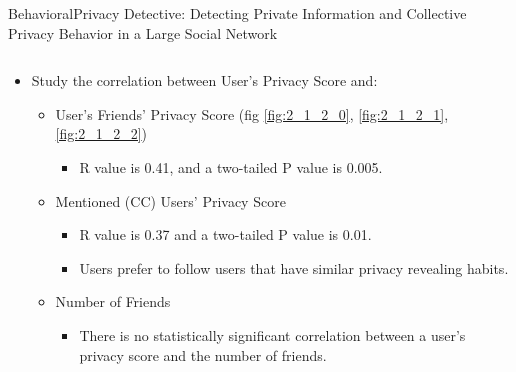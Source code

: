 \begin{frame}{Behavioral}{Privacy Detective: Detecting Private Information and Collective Privacy Behavior in a Large Social Network \cite{caliskanislam_privacy_2014}}
\begin{columns}
\begin{column}{0.65\textwidth}
\begin{itemize}
				\item Study the correlation between User’s Privacy Score and:
					\begin{itemize}
					
						\item User’s Friends’ Privacy Score (fig \ref{fig:2_1_2_0}, \ref{fig:2_1_2_1}, \ref{fig:2_1_2_2})
							\begin{itemize}
								\item R value is 0.41, and a two-tailed P value is 0.005.
							\end{itemize}
							
						\item Mentioned (CC) Users’ Privacy Score
							\begin{itemize}
						
								\item R value is 0.37 and a two-tailed P value is 0.01.
								\item Users prefer to follow users that have similar privacy revealing habits.
						
							\end{itemize}
							
						\item Number of Friends
							\begin{itemize}
						
								\item There is no statistically significant correlation between a user’s privacy score and the number of friends.
						
							\end{itemize}
							
					\end{itemize}
		
			\end{itemize}
		
		\end{column}
	\end{columns}

\end{frame}

